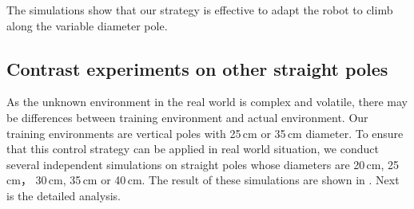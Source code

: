 %	


The simulations show that our strategy is effective to adapt the robot to climb along the variable diameter pole.

\subsection{Contrast experiments on other straight poles}

As the unknown environment in the real world is complex and volatile, there may be differences between training environment and actual environment. Our training environments are vertical poles with 25\,cm or 35\,cm diameter. To ensure that this control strategy can be applied in real world situation, we conduct several  independent simulations on straight poles whose diameters are 20\,cm, 25\,cm， 30\,cm, 35\,cm or 40\,cm. The result of these simulations are shown in . Next is the detailed analysis.

